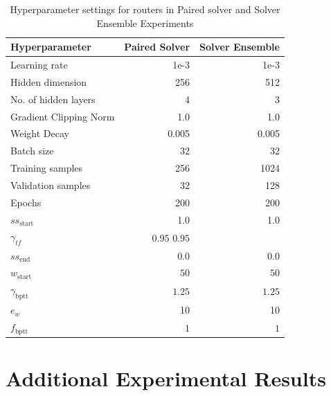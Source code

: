 \documentclass{article}
\begin{document}
\begin{table}[H]
    \centering
    \caption{Hyperparameter settings for routers in Paired solver and Solver Ensemble Experiments}
    \begin{tabular}{lrr}
        \hline
        Hyperparameter & Paired Solver & Solver Ensemble\\
        \hline \hline
        Learning rate & 1e-3 & 1e-3\\
        Hidden dimension & 256 & 512\\
        No. of hidden layers & 4 & 3\\
        Gradient Clipping Norm & 1.0 & 1.0 \\
        Weight Decay & 0.005 & 0.005 \\
        Batch size & 32 & 32 \\
        Training samples & 256 & 1024\\
        Validation samples & 32 & 128 \\
        Epochs & 200 & 200\\
        $ss_{\text{start}}$ & 1.0 & 1.0\\
        $\gamma_{tf}$ & $0.95$  $0.95$ \\
        $ss_{\text{end}}$ & 0.0 & 0.0 \\
        $w_{\text{start}}$ & $50$ & $50$ \\
        $\gamma_{\text{bptt}}$ & $1.25$ & $1.25$\\
        $e_w$ & 10 & 10\\
        $f_{\text{bptt}}$ & $1$ & $1$\\
        \hline
    \end{tabular}
    \label{tab:routerhpsettings}
\end{table}



\section{Additional Experimental Results} \label{sec:moreexperimentalresults}
\end{document}
